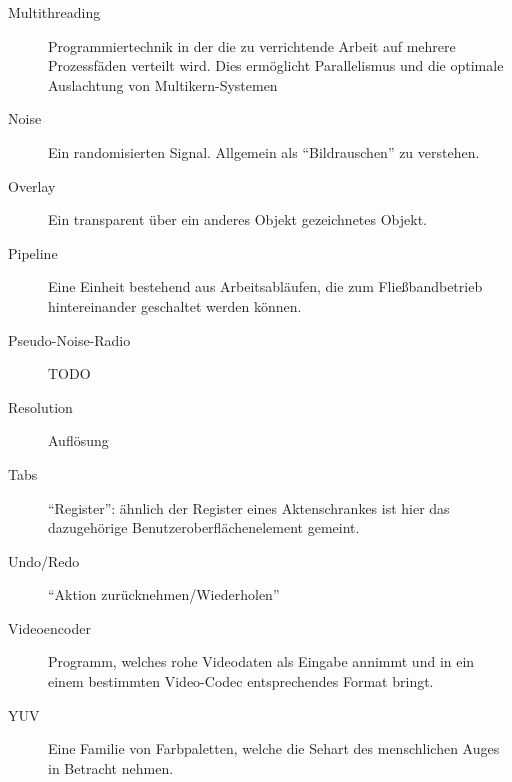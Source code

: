 \begin{description}
    \item[Multithreading] Programmiertechnik in der die zu verrichtende Arbeit auf mehrere Prozessfäden verteilt wird. Dies ermöglicht Parallelismus und die optimale Auslachtung von Multikern-Systemen
    \item[Noise] Ein randomisierten Signal. Allgemein als ``Bildrauschen'' zu verstehen.
    \item[Overlay] Ein transparent über ein anderes Objekt gezeichnetes Objekt.
    \item[Pipeline] Eine Einheit bestehend aus Arbeitsabläufen, die zum Fließbandbetrieb hintereinander geschaltet werden können.
    \item[Pseudo-Noise-Radio] TODO %
    \item[Resolution] Auflösung
    \item[Tabs] ``Register'': ähnlich der Register eines Aktenschrankes ist hier das dazugehörige Benutzeroberflächenelement gemeint.
    \item[Undo/Redo] ``Aktion zurücknehmen/Wiederholen''
    \item[Videoencoder] Programm, welches rohe Videodaten als Eingabe annimmt und in ein einem bestimmten Video-Codec entsprechendes Format bringt.
    \item[YUV] Eine Familie von Farbpaletten, welche die Sehart des menschlichen Auges in Betracht nehmen.
\end{description}
